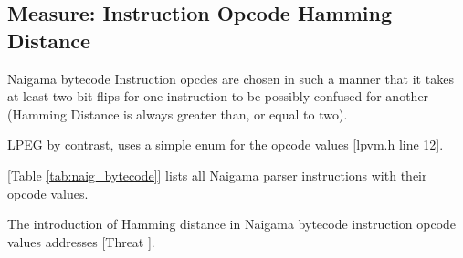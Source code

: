 \subsection{Measure: Instruction Opcode Hamming Distance}

Naigama bytecode Instruction opcdes are chosen in such a manner
that it takes at least two bit flips for one instruction to be
possibly confused for another (Hamming Distance is always greater than,
or equal to two).

LPEG \cite{bib:lpeg} by contrast, uses a simple enum for the
opcode values [lpvm.h line 12].

[Table \ref{tab:naig_bytecode}] lists all Naigama parser
instructions with their opcode values.

The introduction of Hamming distance in Naigama bytecode instruction
opcode values addresses [Threat \thethreatbcupset].


